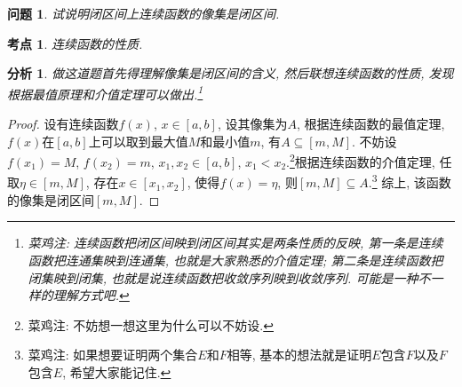 \documentclass[a4paper, 12pt]{ctexart}
\theoremstyle{plain}
\newtheorem{problem}{问题}
\theoremstyle{nonumberplain}
\newtheorem{proof}{证明}
\newtheorem{analysis}{分析}
\newtheorem{category}{考点}
\newcommand{\efootnote}[1]{\footnote{菜鸡注: #1}}
\begin{document}
\begin{problem}
    试说明闭区间上连续函数的像集是闭区间.
\end{problem}
\begin{category}
    连续函数的性质.
\end{category}
\begin{analysis}
    做这道题首先得理解像集是闭区间的含义, 然后联想连续函数的性质, 发现根据最值原理和介值定理可以做出.\efootnote{连续函数把闭区间映到闭区间其实是两条性质的反映, 第一条是连续函数把连通集映到连通集, 也就是大家熟悉的介值定理; 第二条是连续函数把闭集映到闭集, 也就是说连续函数把收敛序列映到收敛序列. 可能是一种不一样的理解方式吧.}
\end{analysis}
\begin{proof}
    设有连续函数$f(x)$, $x\in [a, b]$, 设其像集为$A$, 根据连续函数的最值定理, $f(x)$在$[a, b]$上可以取到最大值$M$和最小值$m$, 有$A\subseteq[m, M]$. 不妨设$f(x_1)=M$, $f(x_2)=m$, $x_1, x_2\in[a, b]$, $x_1<x_2$.\efootnote{不妨想一想这里为什么可以不妨设.}根据连续函数的介值定理, 任取$\eta\in[m, M]$, 存在$x\in [x_1, x_2]$, 使得$f(x)=\eta$, 则$[m, M]\subseteq A$.\efootnote{如果想要证明两个集合$E$和$F$相等, 基本的想法就是证明$E$包含$F$以及$F$包含$E$, 希望大家能记住.} 综上, 该函数的像集是闭区间$[m, M]$.
\end{proof}
\end{document}
